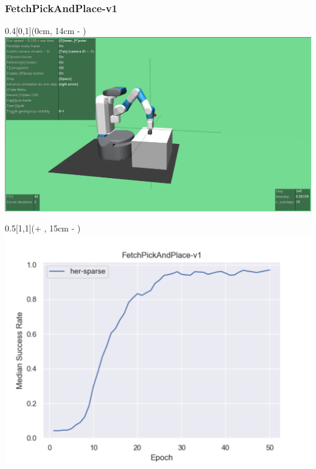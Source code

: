 


\begin{frame}
	\frametitle{FetchPickAndPlace-v1}	
	\vspace{1cm}
	
	\begin{textblock*}{0.4\paperwidth}[0,1](0cm, 14cm - \PraesentationSeitenrand)%
		\includegraphics[width=0.4\paperwidth]{./Ressourcen/Figures/FetchPickAndPlace-v1.pdf}
	\end{textblock*}
	
	\begin{textblock*}{0.5\paperwidth}[1,1](\textwidth + \PraesentationSeitenrand, 15cm - \PraesentationSeitenrand)%
		\includegraphics[width=0.5\paperwidth]{./Ressourcen/Figures/fig_FetchPickAndPlace-v1.pdf}
	\end{textblock*}
	
\end{frame}
\clearpage


